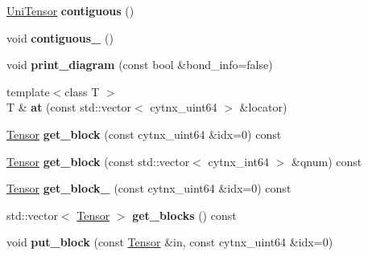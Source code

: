\begin{DoxyCompactItemize}
\mbox{\label{classcytnx_1_1UniTensor_a450c62c231335103f723b96d0c08d18f}} 
\hyperlink{classcytnx_1_1UniTensor}{Uni\+Tensor} {\bfseries contiguous} ()
\item 
\mbox{\label{classcytnx_1_1UniTensor_a80a6e52a909c02c577ebeeb815f93ebf}} 
void {\bfseries contiguous\+\_\+} ()
\item 
\mbox{\label{classcytnx_1_1UniTensor_a685061555097873eb172381059fda92b}} 
void {\bfseries print\+\_\+diagram} (const bool \&bond\+\_\+info=false)
\item 
\mbox{\label{classcytnx_1_1UniTensor_a432b37f45cd8a87ceefd45eb2d8e6330}} 
{\footnotesize template$<$class T $>$ }\\T \& {\bfseries at} (const std\+::vector$<$ cytnx\+\_\+uint64 $>$ \&locator)
\item 
\mbox{\label{classcytnx_1_1UniTensor_a7d4df6dffeca0fd8eafdb9d766813f84}} 
\hyperlink{classcytnx_1_1Tensor}{Tensor} {\bfseries get\+\_\+block} (const cytnx\+\_\+uint64 \&idx=0) const
\item 
\mbox{\label{classcytnx_1_1UniTensor_a9d08b8f666a998f435ccc2ac96e6c7e5}} 
\hyperlink{classcytnx_1_1Tensor}{Tensor} {\bfseries get\+\_\+block} (const std\+::vector$<$ cytnx\+\_\+int64 $>$ \&qnum) const
\item 
\mbox{\label{classcytnx_1_1UniTensor_a216d54f936554fa11b1edaff968d69d4}} 
\hyperlink{classcytnx_1_1Tensor}{Tensor} {\bfseries get\+\_\+block\+\_\+} (const cytnx\+\_\+uint64 \&idx=0) const
\item 
\mbox{\label{classcytnx_1_1UniTensor_a661bc7073dc51b16a4b9802bbcc3cba2}} 
std\+::vector$<$ \hyperlink{classcytnx_1_1Tensor}{Tensor} $>$ {\bfseries get\+\_\+blocks} () const
\item 
\mbox{\label{classcytnx_1_1UniTensor_abcd3008bf05771f0623ce1ef80b1085a}} 
void {\bfseries put\+\_\+block} (const \hyperlink{classcytnx_1_1Tensor}{Tensor} \&in, const cytnx\+\_\+uint64 \&idx=0)
\item 

\end{DoxyCompactItemize}
